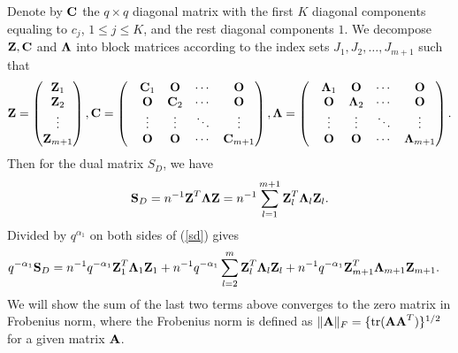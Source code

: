 \documentclass{statsoc}
\newcommand{\bA}{\mbox{\bf A}}
\newcommand{\bC}{\mbox{\bf C}}
\newcommand{\bO}{\mbox{\bf O}}
\newcommand{\bS}{\mbox{\bf S}}
\newcommand{\bZ}{\mbox{\bf Z}}
\newcommand{\bLambda}{\mbox{\boldmath $\Lambda$}}
\newcommand{\tr}{\mathrm{tr}}
\def\t{^T}
\begin{document}
Denote by $\bC$ the $q \times q$ diagonal matrix with the first $K$ diagonal components equaling to $c_j$, $1 \leq j \leq K$, and the rest diagonal components $1$. We decompose $\bZ,\bC$ and $\bLambda$ into block matrices according to the index sets $J_1, J_2, \dots, J_{m + 1}$ such that
\begin{equation}\label{C}
\bZ = \begin{pmatrix} \bZ_1\\ \bZ_2\\ \vdots \\\bZ_{m + 1}\end{pmatrix},
\bC = \begin{pmatrix}
&\bC_1 &\bO &\cdots &\bO\\
&\bO &\bC_2 &\cdots &\bO\\
&\vdots &\vdots &\ddots &\vdots\\
&\bO &\bO &\cdots &\bC_{m + 1}
\end{pmatrix},
\bLambda = \begin{pmatrix}
&\bLambda_1 &\bO &\cdots &\bO\\
&\bO &\bLambda_2 &\cdots &\bO\\
&\vdots &\vdots &\ddots &\vdots\\
&\bO &\bO &\cdots &\bLambda_{m + 1}
\end{pmatrix}.
\end{equation}
Then for the dual matrix $S_D$, we have
\begin{equation} \label{sd}
\bS_D = n^{-1}\bZ\t \bLambda \bZ =n^{-1}\sum_{l = 1}^{m + 1} \bZ_l\t \bLambda_l \bZ_l.
\end{equation}
Divided by $q^{\alpha_1}$ on both sides of (\ref{sd}) gives
\begin{align}\label{SDE}
q^{-\alpha_1}\bS_D &= n^{-1}q^{-\alpha_1} \bZ_1\t \bLambda_1 \bZ_1 + n^{-1}q^{-\alpha_1} \sum_{l = 2}^{m} \bZ_l\t \bLambda_l \bZ_l + n^{-1}q^{-\alpha_1} \bZ_{m + 1}\t \bLambda_{m + 1} \bZ_{m + 1}.
\end{align}
We will show the sum of the last two terms above converges to the zero matrix in Frobenius norm, where the Frobenius norm is defined as $\|\bA\|_F = \{\tr(\bA \bA\t)\}^{1/2}$ for a given matrix $\bA$.
\end{document}
